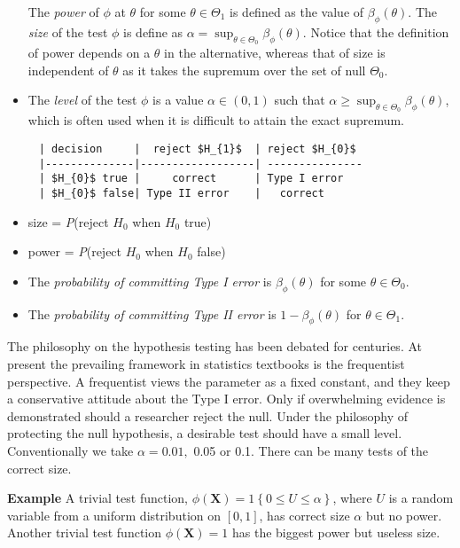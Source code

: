 \documentclass[11pt]{article}
\providecommand{\tightlist}{%
      \setlength{\itemsep}{0pt}\setlength{\parskip}{0pt}}
\begin{document}
\begin{itemize}
  The \emph{power} of \(\phi\) at \(\theta\) for some
  \(\theta\in\Theta_{1}\) is defined as the value of
  \(\beta_{\phi}\left(\theta\right)\). 
  The \emph{size} of the test \(\phi\) is define as
  \(\alpha=\sup_{\theta\in\Theta_{0}}\beta_{\phi}\left(\theta\right).\)
  Notice that the definition of power depends on a \(\theta\) in the
  alternative, whereas that of size is independent of \(\theta\) as it
  takes the supremum over the set of null \(\Theta_0\).
\item
  The \emph{level} of the test \(\phi\) is a value
  \(\alpha\in\left(0,1\right)\) such that
  \(\alpha\geq\sup_{\theta\in\Theta_{0}}\beta_{\phi}\left(\theta\right)\),
  which is often used when it is difficult to attain the exact supremum.
\end{itemize}

    \begin{verbatim}
     | decision     |  reject $H_{1}$  | reject $H_{0}$
     |--------------|------------------| ---------------
     | $H_{0}$ true |     correct      | Type I error
     | $H_{0}$ false| Type II error    |   correct
\end{verbatim}

    \begin{itemize}
\tightlist
\item
  size = \emph{P}(reject \(H_{0}\) when \(H_{0}\) true)
\item
  power = \emph{P}(reject \(H_{0}\) when \(H_{0}\) false)
\item
  The \emph{probability of committing Type I error} is
  \(\beta_{\phi}\left(\theta\right)\) for some \(\theta\in\Theta_{0}\).
\item
  The \emph{probability of committing Type II error} is
  \(1-\beta_{\phi}\left(\theta\right)\) for \(\theta\in\Theta_{1}\).
\end{itemize}

    The philosophy on the hypothesis testing has been debated for centuries.
At present the prevailing framework in statistics textbooks is the
frequentist perspective. A frequentist views the parameter as a fixed
constant, and they keep a conservative attitude about the Type I error.
Only if overwhelming evidence is demonstrated should a researcher reject
the null. Under the philosophy of protecting the null hypothesis, a
desirable test should have a small level. Conventionally we take
\(\alpha=0.01,\) 0.05 or 0.1. There can be many tests of the correct
size.

\bigskip 

\textbf{Example} A trivial test function,
\(\phi(\mathbf{X})=1\left\{ 0\leq U\leq\alpha\right\}\), where \(U\) is
a random variable from a uniform distribution on \(\left[0,1\right]\),
has correct size $\alpha$ but no power. Another trivial test function
\(\phi\left(\mathbf{X}\right)=1\) has the biggest power but useless
size.
\end{document}
